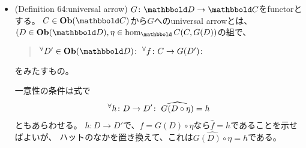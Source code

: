 \documentclass[9pt]{ltjsarticle}
\begin{document}
\begin{itemize}
  \item (Definition 64:universal arrow)
  $G\colon \D \to \C$をfunctorとする。
  $C\in \obj(\C)$から$G$へのuniversal arrowとは、
  $(D \in \obj(\D),\eta \in \hom_\C(C,G(D))$の組で、
  \begin{quote}
    $\Forall{D' \in \obj(\D)}\Forall{f\colon C\to G(D')}$
  \end{quote}
  をみたすもの。

  一意性の条件は式で
  \begin{align}
    {}^{\forall}{h\colon D\to D'}\mathrm{\colon\;} \widehat{G(D\circ \eta)} = h
  \end{align}
  ともあらわせる。
  \pf
  $h\colon D\to D'$で、$f=G(D)\circ \eta$なら$\hat f=h$であることを示せばよいが、
  ハットのなかを置き換えて、これは$\hat{G(D)\circ \eta}=h$である。


\end{itemize}
\end{document}
